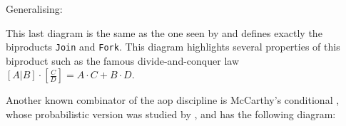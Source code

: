 \documentclass[
  oneside,
  11pt, a4paper,
  footinclude=true,
  headinclude=true,
  cleardoublepage=empty
]{scrbook}
\theoremstyle{definition}
\theoremstyle{definition}
\begin{document}
        \begin{center}
        \end{center}{}
        
        Generalising:
        
        \begin{center}
        \end{center}{}
        
        This last diagram is the same as the one seen by \cite{Macedo2012MatricesAA} and defines exactly the biproducts \texttt{Join} and \texttt{Fork}. This diagram highlights several properties of this biproduct such as the famous divide-and-conquer law $[A|B] \cdot [\frac{C}{D}] = A \cdot C + B \cdot D$.
        
        Another known combinator of the \gls{aop} discipline is McCarthy's conditional \citep{Bird:1997:AP:248932}, whose probabilistic version was studied by \cite{oliveira2012towards}, and has the following diagram:
        
\end{document}
